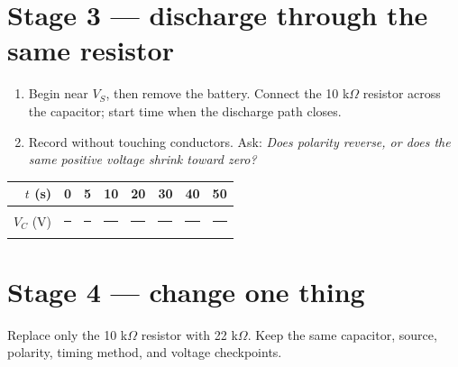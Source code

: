 \section{Stage 3 — discharge through the same resistor}

\begin{enumerate}
\item Begin near \(V_S\), then remove the battery. Connect the 10 k\(\Omega\)
  resistor across the capacitor; start time when the discharge path closes.
\item Record without touching conductors. Ask: \textit{Does polarity reverse,
  or does the same positive voltage shrink toward zero?}
\end{enumerate}

\begin{center}\small
\begin{tabular}{@{}r*{7}{c}@{}}
\toprule
\(t\) (s) & 0 & 5 & 10 & 20 & 30 & 40 & 50\\
\midrule
\(V_C\) (V) & \rule{.82cm}{.3pt}&\rule{.82cm}{.3pt}&\rule{.82cm}{.3pt}&
\rule{.82cm}{.3pt}&\rule{.82cm}{.3pt}&\rule{.82cm}{.3pt}&\rule{.82cm}{.3pt}\\
\bottomrule
\end{tabular}
\end{center}

\begin{center}
\end{center}

\newpage
{}
\begingroup\footnotesize
\setlength{\parskip}{.25em}

\section{Stage 4 — change one thing}

Replace only the 10 k\(\Omega\) resistor with 22 k\(\Omega\). Keep the same
capacitor, source, polarity, timing method, and voltage checkpoints.

